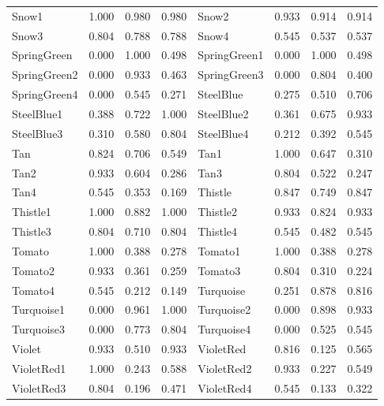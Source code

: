 {\begin{center}
\begin{tabular}{|l|l|l|l|l|l|l|l|}
Snow1               & 1.000 & 0.980 & 0.980 & Snow2               & 0.933 & 0.914 & 0.914 \\ 
Snow3               & 0.804 & 0.788 & 0.788 & Snow4               & 0.545 & 0.537 & 0.537 \\ 
SpringGreen         & 0.000 & 1.000 & 0.498 & SpringGreen1        & 0.000 & 1.000 & 0.498 \\ 
SpringGreen2        & 0.000 & 0.933 & 0.463 & SpringGreen3        & 0.000 & 0.804 & 0.400 \\ 
SpringGreen4        & 0.000 & 0.545 & 0.271 & SteelBlue           & 0.275 & 0.510 & 0.706 \\ 
SteelBlue1          & 0.388 & 0.722 & 1.000 & SteelBlue2          & 0.361 & 0.675 & 0.933 \\ 
SteelBlue3          & 0.310 & 0.580 & 0.804 & SteelBlue4          & 0.212 & 0.392 & 0.545 \\ 
Tan                 & 0.824 & 0.706 & 0.549 & Tan1                & 1.000 & 0.647 & 0.310 \\ 
Tan2                & 0.933 & 0.604 & 0.286 & Tan3                & 0.804 & 0.522 & 0.247 \\ 
Tan4                & 0.545 & 0.353 & 0.169 & Thistle             & 0.847 & 0.749 & 0.847 \\ 
Thistle1            & 1.000 & 0.882 & 1.000 & Thistle2            & 0.933 & 0.824 & 0.933 \\ 
Thistle3            & 0.804 & 0.710 & 0.804 & Thistle4            & 0.545 & 0.482 & 0.545 \\ 
Tomato              & 1.000 & 0.388 & 0.278 & Tomato1             & 1.000 & 0.388 & 0.278 \\ 
Tomato2             & 0.933 & 0.361 & 0.259 & Tomato3             & 0.804 & 0.310 & 0.224 \\ 
Tomato4             & 0.545 & 0.212 & 0.149 & Turquoise           & 0.251 & 0.878 & 0.816 \\ 
Turquoise1          & 0.000 & 0.961 & 1.000 & Turquoise2          & 0.000 & 0.898 & 0.933 \\ 
Turquoise3          & 0.000 & 0.773 & 0.804 & Turquoise4          & 0.000 & 0.525 & 0.545 \\ 
Violet              & 0.933 & 0.510 & 0.933 & VioletRed           & 0.816 & 0.125 & 0.565 \\ 
VioletRed1          & 1.000 & 0.243 & 0.588 & VioletRed2          & 0.933 & 0.227 & 0.549 \\ 
VioletRed3          & 0.804 & 0.196 & 0.471 & VioletRed4          & 0.545 & 0.133 & 0.322 \\ 

\end{tabular}
\end{center}}
